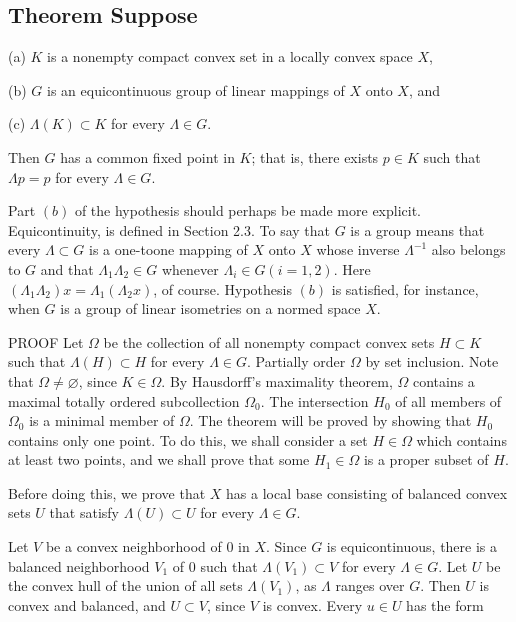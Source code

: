 \documentclass[10pt]{article}
\begin{document}
\subsection{Theorem Suppose}
(a) $K$ is a nonempty compact convex set in a locally convex space $X$,

(b) $G$ is an equicontinuous group of linear mappings of $X$ onto $X$, and

(c) $\Lambda(K) \subset K$ for every $\Lambda \in G$.

Then $G$ has a common fixed point in $K$; that is, there exists $p \in K$ such that $\Lambda p=p$ for every $\Lambda \in G$.

Part $(b)$ of the hypothesis should perhaps be made more explicit. Equicontinuity, is defined in Section 2.3. To say that $G$ is a group means that every $\Lambda \subset G$ is a one-toone mapping of $X$ onto $X$ whose inverse $\Lambda^{-1}$ also belongs to $G$ and that $\Lambda_{1} \Lambda_{2} \in G$ whenever $\Lambda_{i} \in G(i=1,2)$. Here $\left(\Lambda_{1} \Lambda_{2}\right) x=\Lambda_{1}\left(\Lambda_{2} x\right)$, of course. Hypothesis $(b)$ is satisfied, for instance, when $G$ is a group of linear isometries on a normed space $X$.

PROOF Let $\Omega$ be the collection of all nonempty compact convex sets $H \subset K$ such that $\Lambda(H) \subset H$ for every $\Lambda \in G$. Partially order $\Omega$ by set inclusion. Note that $\Omega \neq \varnothing$, since $K \in \Omega$. By Hausdorff's maximality theorem, $\Omega$ contains a maximal totally ordered subcollection $\Omega_{0}$. The intersection $H_{0}$ of all members of $\Omega_{0}$ is a minimal member of $\Omega$. The theorem will be proved by showing that $H_{0}$ contains only one point. To do this, we shall consider a set $H \in \Omega$ which contains at least two points, and we shall prove that some $H_{1} \in \Omega$ is a proper subset of $H$.

Before doing this, we prove that $X$ has a local base consisting of balanced convex sets $U$ that satisfy $\Lambda(U) \subset U$ for every $\Lambda \in G$.

Let $V$ be a convex neighborhood of 0 in $X$. Since $G$ is equicontinuous, there is a balanced neighborhood $V_{1}$ of 0 such that $\Lambda\left(V_{1}\right) \subset V$ for every $\Lambda \in G$. Let $U$ be the convex hull of the union of all sets $\Lambda\left(V_{1}\right)$, as $\Lambda$ ranges over $G$. Then $U$ is convex and balanced, and $U \subset V$, since $V$ is convex. Every $u \in U$ has the form
\end{document}
